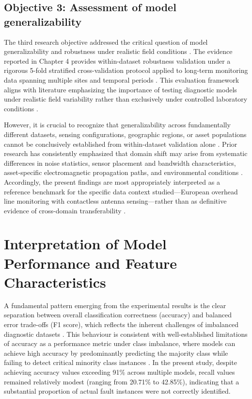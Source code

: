 \subsection{Objective 3: Assessment of model generalizability}

The third research objective addressed the critical question of model generalizability and robustness under realistic field conditions \parencite{Klein_2024_1, Sikorski_2025}. The evidence reported in Chapter 4 provides within-dataset robustness validation under a rigorous 5-fold stratified cross-validation protocol applied to long-term monitoring data spanning multiple sites and temporal periods \parencite{Srivastava_2023_1, Florkowski_2024}. This evaluation framework aligns with literature emphasizing the importance of testing diagnostic models under realistic field variability rather than exclusively under controlled laboratory conditions \parencite{Vera_2023_1, Sikorski_2025}.

However, it is crucial to recognize that generalizability across fundamentally different datasets, sensing configurations, geographic regions, or asset populations cannot be conclusively established from within-dataset validation alone \parencite{Raymond_2022, Seitz_2024_1}. Prior research has consistently emphasized that domain shift may arise from systematic differences in noise statistics, sensor placement and bandwidth characteristics, asset-specific electromagnetic propagation paths, and environmental conditions \parencite{Orellana_2023_1, Friebe_2024}. Accordingly, the present findings are most appropriately interpreted as a reference benchmark for the specific data context studied—European overhead line monitoring with contactless antenna sensing—rather than as definitive evidence of cross-domain transferability \parencite{Srivastava_2023_1, Sikorski_2025}.

\section{Interpretation of Model Performance and Feature Characteristics}

A fundamental pattern emerging from the experimental results is the clear separation between overall classification correctness (accuracy) and balanced error trade-offs (F1 score), which reflects the inherent challenges of imbalanced diagnostic datasets \parencite{Zemouri_2023_1, Srivastava_2023_1}. This behaviour is consistent with well-established limitations of accuracy as a performance metric under class imbalance, where models can achieve high accuracy by predominantly predicting the majority class while failing to detect critical minority class instances \parencite{Zemouri_2023_1, Adhikari_2024}. In the present study, despite achieving accuracy values exceeding 91\% across multiple models, recall values remained relatively modest (ranging from 20.71\% to 42.85\%), indicating that a substantial proportion of actual fault instances were not correctly identified.

